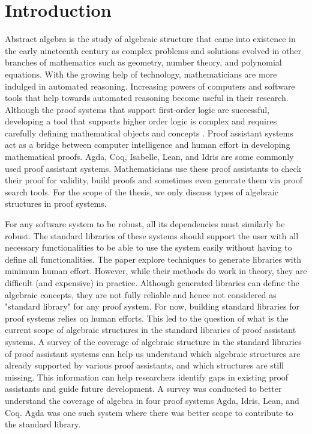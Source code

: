 \chapter{Introduction}
Abstract algebra is the study of algebraic structure that came into existence in
the early nineteenth century as complex problems and solutions evolved in other
branches of mathematics such as geometry, number theory, and polynomial
equations. With the growing help of technology, mathematicians are more indulged
in automated reasoning. Increasing powers of computers and software tools that
help towards automated reasoning become useful in their research. Although the
proof systems that support first-order logic are successful, developing a tool
that supports higher order logic is complex and requires carefully defining
mathematical objects and concepts \cite{phillips2010automated}. Proof assistant
systems act as a bridge between computer intelligence and human effort in
developing mathematical proofs. Agda, Coq, Isabelle, Lean, and Idris are some
commonly used proof assistant systems. Mathematicians use these proof assistants
to check their proof for validity, build proofs and sometimes even generate them
via proof search tools. For the scope of the thesis, we only discuss types of
algebraic structures in proof systems.

For any software system to be robust, all its dependencies must similarly be
robust. The standard libraries of these systems should support the user with all
necessary functionalities to be able to use the system easily without having to
define all functionalities. The paper \cite{BuildingDiamond} explore techniques
to generate libraries with minimum human effort. However, while their methods do
work in theory, they are difficult (and expensive) in practice. Although
generated libraries can define the algebraic concepts, they are not fully
reliable and hence not considered as "standard library" for any proof system.
For now, building standard libraries for proof systems relies on human efforts.
This led to the question of what is the current scope of algebraic structures in
the standard libraries of proof assistant systems. A survey of the coverage of
algebraic structure in the standard libraries of proof assistant systems can
help us understand which algebraic structures are already supported by various
proof assistants, and which structures are still missing. This information can
help researchers identify gaps in existing proof assistants and guide future
development. A survey was conducted to better understand the coverage of algebra
in four proof systems Agda, Idris, Lean, and Coq. Agda was one such system where
there was better scope to contribute to the standard library.

